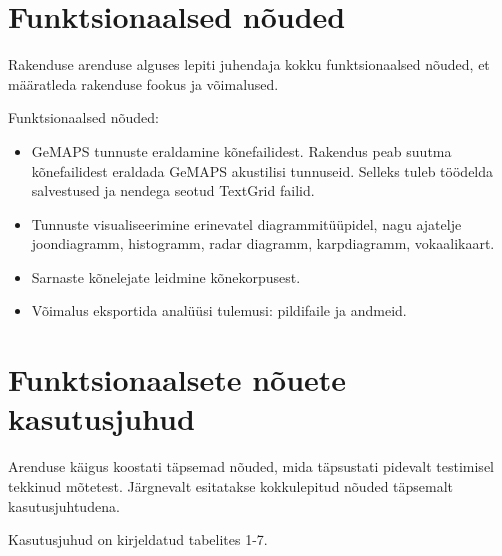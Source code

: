 \section{Funktsionaalsed nõuded}
Rakenduse arenduse alguses lepiti juhendaja kokku funktsionaalsed nõuded, et määratleda rakenduse fookus ja võimalused. 

Funktsionaalsed nõuded:
\begin{itemize}
    \item GeMAPS tunnuste eraldamine kõnefailidest. Rakendus peab suutma kõnefailidest eraldada GeMAPS akustilisi tunnuseid. Selleks tuleb töödelda salvestused ja nendega seotud TextGrid failid.
   
    \item Tunnuste visualiseerimine erinevatel diagrammitüüpidel, nagu ajatelje joondiagramm, histogramm, radar diagramm, karpdiagramm, vokaalikaart.
    
    \item Sarnaste kõnelejate leidmine kõnekorpusest.

    \item Võimalus eksportida analüüsi tulemusi: pildifaile ja andmeid.
\end{itemize}

\section{Funktsionaalsete nõuete kasutusjuhud}
Arenduse käigus koostati täpsemad nõuded, mida täpsustati pidevalt testimisel tekkinud mõtetest. Järgnevalt esitatakse kokkulepitud nõuded täpsemalt kasutusjuhtudena.

Kasutusjuhud on kirjeldatud tabelites 1-7.

